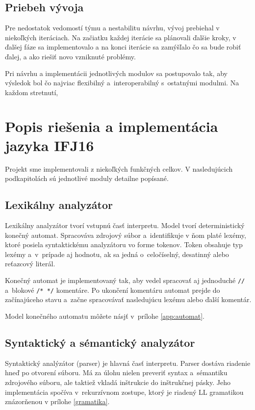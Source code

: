 \documentclass[11pt,a4paper]{article}
\begin{document}
    \subsection{Priebeh vývoja}
    \label{vyvoj}
    Pre nedostatok vedomostí týmu a nestabilitu návrhu, vývoj prebiehal v niekoľkých iteráciach. Na začiatku každej iterácie sa plánovali ďalšie kroky, v ďalšej fáze sa implementovalo a na konci iterácie sa zamýšľalo čo sa bude robiť ďalej, a ako riešiť novo vzniknuté problémy.

    Pri návrhu a implementácii jednotlivých modulov sa postupovalo tak, aby výsledok bol čo najviac flexibilný a~interoperabilný s~ostatnými modulmi. Na každom stretnutí, 

\section{Popis riešenia a implementácia jazyka IFJ16}
\label{popis}

Projekt sme implementovali z niekoľkých funkčných celkov. V nasledujúcich podkapitolách sú jednotlivé moduly detailne popísané.

    \subsection{Lexikálny analyzátor}
    \label{lexer}
    Lexikálny analyzátor tvorí vstupnú časť interpretu. Model tvorí deterministický konečný automat.
    Spracováva zdrojový súbor a~identifikuje v ňom platé lexémy, ktoré posiela syntaktickému analyzátoru vo forme tokenov.
    Token obsahuje typ lexémy a~v~prípade aj hodnotu, ak sa jedná o~celočíselný, desatinný alebo reťazcový literál.

    Konečný automat je implementovaný tak, aby vedel spracovať aj jednoduché \texttt{//} a~blokové \texttt{/* */} komentáre.
    Po ukončení komentáru  automat prejde do začínajúceho stavu a~začne spracovávať nasledujúcu lexému alebo ďalší komentár.

    Model konečného automatu môžete násjť v~prílohe \ref{app:automat}.


    \subsection{Syntaktický a sémantický analyzátor}
    \label{parser}
    Syntaktický analýzátor (parser) je hlavná časť interpretu. Parser dostáva riadenie hneď po otvorení súboru. Má za úlohu nielen preveriť syntax a~sémantiku zdrojového súboru, ale taktiež vkladá inštrukcie do inštrukčnej pásky. Jeho implementácia spočíva v~rekurzívnom zostupe, ktorý je riadený LL gramatikou znázorňenou v prílohe \ref{gramatika}.
\end{document}
